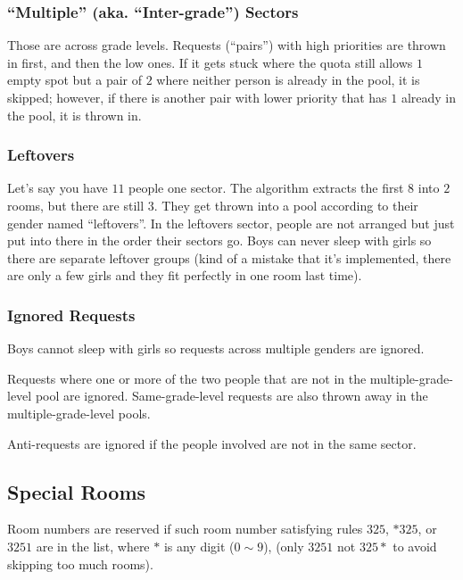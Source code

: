 \documentclass[openany,notitlepage]{book}
\begin{document}
	\subsubsection{``Multiple''  (aka. ``Inter-grade'') Sectors}\label{intergrade}
	
	Those are across grade levels. Requests (``pairs'') with high priorities are thrown in first, and then the low ones.
	If it gets stuck where the quota still allows $1$ empty spot but a pair of $2$ where neither person is already in the pool,
	it is skipped; however, if there is another pair with lower priority that has $1$ already in the pool, it is thrown in.
	
	\subsubsection{Leftovers}  \label{lefto}
	
	Let's say you have $11$ people one sector. The algorithm extracts the first $8$ into $2$ rooms, but there are still $3$.
	They get thrown into a pool according to their gender named ``leftovers''. In the leftovers sector, people are not
	arranged but just put into there in the order their sectors go. Boys can never sleep with girls so there are separate
	leftover groups (kind of a mistake that it's implemented, there are only a few girls and they fit perfectly in one room
	last time).
	
	\subsubsection{Ignored Requests}
	Boys cannot sleep with girls so requests across multiple genders are ignored.
	
	Requests where one or more of the two people that are not in the multiple-grade-level pool are ignored.
	Same-grade-level requests are also thrown away in the multiple-grade-level pools.
	
	Anti-requests are ignored if the people involved are not in the same sector.
	
	\subsection{Special Rooms}\label{325}
	Room numbers are reserved if such room number satisfying rules $325$, $*325$, or $3251$ are in the list, where $*$ is any digit ($0\sim9$), (only $3251$ not $325*$ to avoid skipping too much rooms).
	
\end{document}
